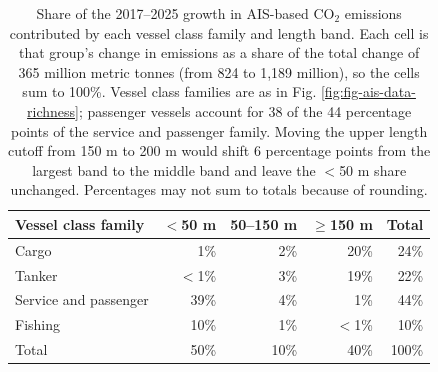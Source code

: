 \begin{table}[!h]
\centering
\caption{\label{tab:growth_share_by_family_length}Share of the 2017--2025 growth in AIS-based CO$_{2}$ emissions contributed by each vessel class family and length band. Each cell is that group's change in emissions as a share of the total change of 365 million metric tonnes (from 824 to 1,189 million), so the cells sum to 100\%. Vessel class families are as in Fig. \ref{fig:fig-ais-data-richness}; passenger vessels account for 38 of the 44 percentage points of the service and passenger family. Moving the upper length cutoff from 150 m to 200 m would shift 6 percentage points from the largest band to the middle band and leave the $<$50 m share unchanged. Percentages may not sum to totals because of rounding.}
\centering
\fontsize{7}{9}\selectfont
\begin{tabular}[t]{lrrrr}
\toprule
Vessel class family & $<$50 m & 50--150 m & $\geq$150 m & Total\\
\midrule
Cargo & 1\% & 2\% & 20\% & 24\%\\
Tanker & $<$1\% & 3\% & 19\% & 22\%\\
Service and passenger & 39\% & 4\% & 1\% & 44\%\\
Fishing & 10\% & 1\% & $<$1\% & 10\%\\
\midrule
Total & 50\% & 10\% & 40\% & 100\%\\
\bottomrule
\end{tabular}
\end{table}
